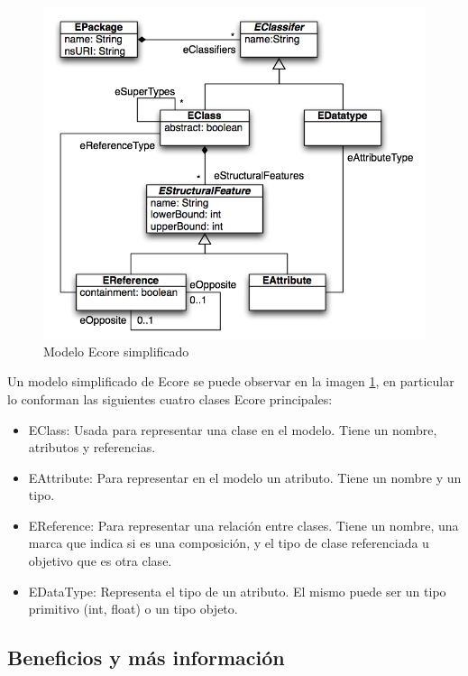 \documentclass[a4paper,12pt,oneside,spanish]{book}
\begin{document}
\begin{figure}[hbtp]
\centering
\includegraphics[scale=1]{./img/Ecore}
\caption{Modelo Ecore simplificado}
\label{fig:EcoreModel}
\end{figure}

Un modelo simplificado de \textsf{Ecore} se puede observar en la imagen \ref{fig:EcoreModel}, en particular lo conforman las siguientes cuatro clases \textsf{Ecore} principales:
\begin{itemize}

\item \textsf{EClass}: Usada para representar una clase en el modelo. Tiene un nombre, atributos y referencias.

\item \textsf{EAttribute}: Para representar en el modelo un atributo. Tiene un nombre y un tipo.

\item \textsf{EReference}: Para representar una relación entre clases. Tiene un nombre, una marca que indica si es una composición, y el tipo de clase referenciada u objetivo que es otra clase.

\item \textsf{EDataType}: Representa el tipo de un atributo. El mismo puede ser un tipo primitivo (\textsf{int}, \textsf{float}) o un tipo objeto.

\end{itemize}

\subsection{Beneficios y más información}
\end{document}
